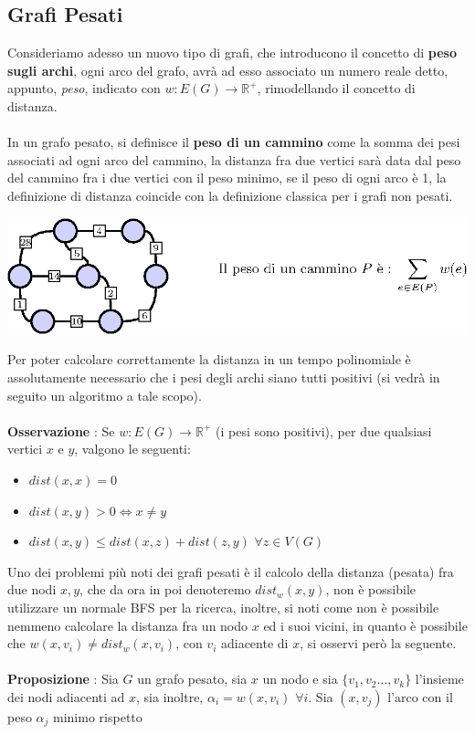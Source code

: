 \documentclass[12pt, letterpaper]{article}
\newcommand{\acc}{\\\hphantom{}\\}
\begin{document}
\subsection{Grafi Pesati}
Consideriamo adesso un nuovo tipo di grafi, che introducono il concetto di \textbf{peso sugli archi}, ogni arco del grafo,
avrà ad esso associato un numero reale detto, appunto, \textit{peso}, indicato con $w : E(G)\rightarrow \mathbb{R}^+$,
rimodellando il concetto di distanza.\acc
In un grafo pesato, si definisce il \textbf{peso di un cammino} come la somma dei pesi associati ad ogni arco del cammino,
la distanza fra due vertici sarà data dal peso del cammino fra i due vertici con il peso minimo, se il peso di ogni
arco è 1, la definizione di distanza coincide con la definizione classica per i grafi non pesati. \begin{center}
    \includegraphics[width=1\textwidth ]{images/grafoPesato.eps}
\end{center}
Per poter calcolare correttamente la distanza in un tempo polinomiale è assolutamente necessario che
i pesi degli archi siano tutti positivi (si vedrà in seguito un algoritmo a tale scopo).\acc
\textbf{Osservazione} : Se  $w : E(G)\rightarrow \mathbb{R}^+$ (i pesi sono positivi), per due qualsiasi
vertici $x$ e $y$, valgono le seguenti:\begin{itemize}
    \item $dist(x,x)=0$
    \item $dist(x,y)>0\iff x\ne y$
    \item $dist(x,y)\le dist(x,z)+dist(z,y)$ $\forall z\in V(G)$
\end{itemize}
Uno dei problemi più noti dei grafi pesati è il calcolo della distanza (pesata) fra due nodi $x,y$, che da ora in
poi denoteremo $dist_w(x,y)$, non è possibile utilizzare un normale BFS per la ricerca, inoltre, si noti come non è possibile
nemmeno calcolare la distanza fra un nodo $x$ ed i suoi vicini, in quanto è possibile che $w(x,v_i)\ne dist_w(x,v_i)$, con
$v_i$ adiacente di $x$, si osservi però la seguente.\acc
\textbf{Proposizione} : Sia $G$ un grafo pesato, sia $x$ un nodo e sia $\{v_1,v_2\dots,v_k\}$ l'insieme dei nodi adiacenti
ad $x$, sia inoltre, $\alpha_i=w(x,v_i)$ $\forall i$. Sia $(x,v_j)$ l'arco con il peso $\alpha_j$ minimo rispetto
\end{document}
